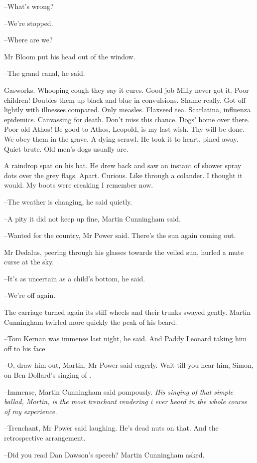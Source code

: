 --What's wrong?

--We're stopped.

--Where are we?

Mr Bloom put his head out of the window.

--The grand canal,
he said.

Gasworks.
Whooping cough they say it cures.
Good job Milly never got it.
Poor children!
Doubles them up black and blue in convulsions.
Shame really.
Got off lightly with illnesses compared.
Only measles.
Flaxseed tea.
Scarlatina, influenza epidemics.
Canvassing for death.
Don't miss this chance.
Dogs' home over there.
Poor old Athos!
Be good to Athos, Leopold, is my last wish.
Thy will be done.
We obey them in the grave.
A dying scrawl.
He took it to heart, pined away.
Quiet brute.
Old men's dogs usually are.

A raindrop spat on his hat.
He drew back and saw an instant of shower spray dots over the grey flags.
Apart.
Curious.
Like through a colander.
I thought it would.
My boots were creaking I remember now.

--The weather is changing,
he said quietly.

--A pity it did not keep up fine,
Martin Cunningham said.

--Wanted for the country,
Mr Power said.
There's the sun again coming out.

Mr Dedalus, peering through his glasses towards the veiled sun,
hurled a mute curse at the sky.

--It's as uncertain as a child's bottom,
he said.

--We're off again.

The carriage turned again its stiff wheels
and their trunks swayed gently.
Martin Cunningham twirled more quickly the peak of his beard.

--Tom Kernan was immense last night,
he said.
And Paddy Leonard taking him off to his face.

--O, draw him out, Martin,
Mr Power said eagerly.
Wait till you hear him, Simon,
on Ben Dollard's singing of .

--Immense,
Martin Cunningham said pompously.
\emph{His singing of that simple ballad, Martin,
is the most trenchant rendering i ever heard in the whole course of my experience.}

--Trenchant,
Mr Power said laughing.
He's dead nuts on that.
And the retrospective arrangement.

--Did you read Dan Dawson's speech?
Martin Cunningham asked.

